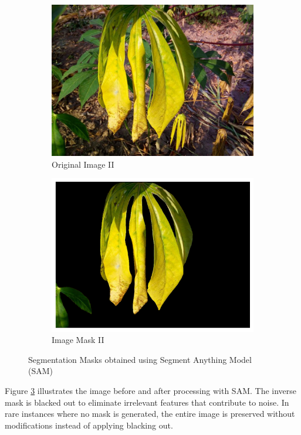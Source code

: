 \begin{figure}[t]
\begin{subfigure}[b]{0.22\linewidth}
        \centering
        \includegraphics[width=\linewidth]{graphs/samraw2.jpg}
        \caption{Original Image II}
        \label{fig:Original Image (2)}
    \end{subfigure}
     \hfill
     \begin{subfigure}[b]{0.22\linewidth}
        \centering
        \includegraphics[width=\linewidth]{graphs/sam2.png}
        \caption{Image Mask II}
        \label{fig:Segmentation mask (2)}
    \end{subfigure}
    \caption{Segmentation Masks obtained using Segment Anything Model (SAM)}
    \label{fig:four_images}
\end{figure}

Figure \ref{fig:four_images} illustrates the image before and after processing with SAM. The inverse mask is blacked out to eliminate irrelevant features that contribute to noise. In rare instances where no mask is generated, the entire image is preserved without modifications instead of applying blacking out.